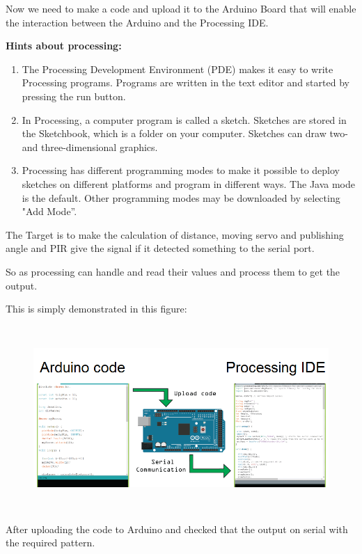 Now we need to make a code and upload it to the Arduino Board that will enable the interaction between the Arduino and the Processing IDE.

\textbf{Hints about processing:}

\begin{enumerate}
\item \textbf{ }The Processing Development Environment (PDE) makes it easy to write Processing programs. Programs are written in the text editor and started by pressing the run button. 

\item  In Processing, a computer program is called a sketch. Sketches are stored in the Sketchbook, which is a folder on your computer. Sketches can draw two- and three-dimensional graphics.

\item  Processing has different programming modes to make it possible to deploy sketches on different platforms and program in different ways. The Java mode is the default. Other programming modes may be downloaded by selecting "Add Mode''.
\end{enumerate}

The Target is to make the calculation of distance, moving servo and publishing angle and PIR give the signal if it detected something to the serial port.

So as processing can handle and read their values and process them to get the output.

This is simply demonstrated in this figure:

\begin{figure}[H]
	\centering
	\includegraphics[width=14cm,height=7cm]{figures/sonar2}
\end{figure}
After uploading the code to Arduino and checked that the output on serial with the required pattern.

